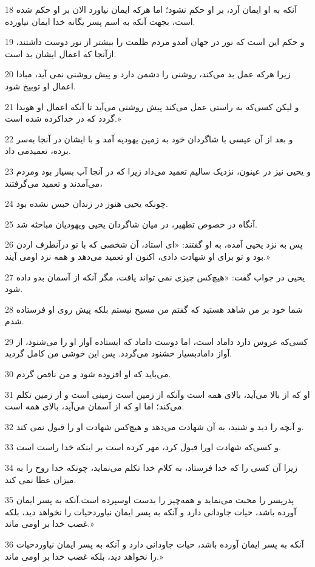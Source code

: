 \par 18 آنکه به او ایمان آرد، بر او حکم نشود؛ اما هر‌که ایمان نیاورد الان بر او حکم شده است، بجهت آنکه به اسم پسر یگانه خدا ایمان نیاورده.
\par 19 و حکم این است که نور در جهان آمدو مردم ظلمت را بیشتر از نور دوست داشتند، ازآنجا که اعمال ایشان بد است.
\par 20 زیرا هر‌که عمل بد می‌کند، روشنی را دشمن دارد و پیش روشنی نمی آید، مبادا اعمال او توبیخ شود.
\par 21 و لیکن کسی‌که به راستی عمل می‌کند پیش روشنی می‌آید تا آنکه اعمال او هویدا گردد که در خداکرده شده است.»
\par 22 و بعد از آن عیسی با شاگردان خود به زمین یهودیه آمد و با ایشان در آنجا به‌سر برده، تعمیدمی داد.
\par 23 و یحیی نیز در عینون، نزدیک سالیم تعمید می‌داد زیرا که در آنجا آب بسیار بود ومردم می‌آمدند و تعمید می‌گرفتند،
\par 24 چونکه یحیی هنوز در زندان حبس نشده بود.
\par 25 آنگاه در خصوص تطهیر، در میان شاگردان یحیی ویهودیان مباحثه شد.
\par 26 پس به نزد یحیی آمده، به او گفتند: «ای استاد، آن شخصی که با تو درآنطرف اردن بود و تو برای او شهادت دادی، اکنون او تعمید می‌دهد و همه نزد اومی آیند.»
\par 27 یحیی در جواب گفت: «هیچ‌کس چیزی نمی تواند یافت، مگر آنکه از آسمان بدو داده شود.
\par 28 شما خود بر من شاهد هستید که گفتم من مسیح نیستم بلکه پیش روی او فرستاده شدم.
\par 29 کسی‌که عروس دارد داماد است، اما دوست داماد که ایستاده آواز او را می‌شنود، از آواز دامادبسیار خشنود می‌گردد. پس این خوشی من کامل گردید.
\par 30 می‌باید که او افزوده شود و من ناقص گردم.
\par 31 او که از بالا می‌آید، بالای همه است وآنکه از زمین است زمینی است و از زمین تکلم می‌کند؛ اما او که از آسمان می‌آید، بالای همه است.
\par 32 و آنچه را دید و شنید، به آن شهادت می‌دهد و هیچ‌کس شهادت او را قبول نمی کند.
\par 33 و کسی‌که شهادت اورا قبول کرد، مهر کرده است بر اینکه خدا راست است.
\par 34 زیرا آن کسی را که خدا فرستاد، به کلام خدا تکلم می‌نماید، چونکه خدا روح را به میزان عطا نمی کند.
\par 35 پدرپسر را محبت می‌نماید و همه‌چیز را بدست اوسپرده است.آنکه به پسر ایمان آورده باشد، حیات جاودانی دارد و آنکه به پسر ایمان نیاوردحیات را نخواهد دید، بلکه غضب خدا بر اومی ماند.»
\par 36 آنکه به پسر ایمان آورده باشد، حیات جاودانی دارد و آنکه به پسر ایمان نیاوردحیات را نخواهد دید، بلکه غضب خدا بر اومی ماند.»

